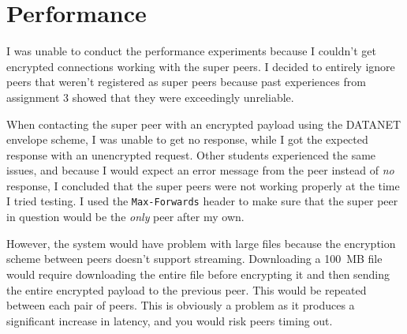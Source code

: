 \documentclass{sig-alternate}
\begin{document}
\section{Performance}

I was unable to conduct the performance experiments because I couldn't get
encrypted connections working with the super peers. I decided to entirely
ignore peers that weren't registered as super peers because past experiences
from assignment 3 showed that they were exceedingly unreliable.

When contacting the super peer with an encrypted payload using the DATANET
envelope scheme, I was unable to get no response, while I got the expected
response with an unencrypted request. Other students experienced the same
issues, and because I would expect an error message from the peer instead of
\emph{no} response, I concluded that the super peers were not working properly
at the time I tried testing. I used the \verb+Max-Forwards+ header to make
sure that the super peer in question would be the \emph{only} peer after my
own.

However, the system would have problem with large files because the encryption
scheme between peers doesn't support streaming. Downloading a 100~MB file
would require downloading the entire file before encrypting it and then
sending the entire encrypted payload to the previous peer. This would be
repeated between each pair of peers. This is obviously a problem as it
produces a significant increase in latency, and you would risk peers timing
out.

%

\end{document}
